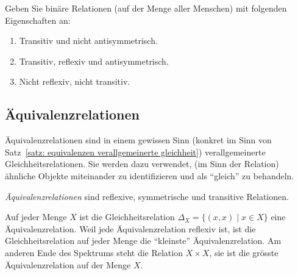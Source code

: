     \begin{ueb}
        Geben Sie binäre Relationen (auf der Menge aller Menschen) mit folgenden Eigenschaften an:
        \begin{enumerate}
            \item Transitiv und nicht antisymmetrisch.
            \item Transitiv, reflexiv und antisymmetrisch.
            \item Nicht reflexiv, nicht transitiv.
        \end{enumerate}
    \end{ueb}
    \begin{lsg}
    \end{lsg}


    \subsection*{Äquivalenzrelationen}

    Äquivalenzrelationen sind in einem gewissen Sinn (konkret im Sinn von Satz~\ref{satz: equivalenzen verallgemeinerte gleichheit}) verallgemeinerte Gleichheitsrelationen. Sie werden dazu verwendet, (im Sinn der Relation) ähnliche Objekte miteinander zu identifizieren und als ``gleich'' zu behandeln.

    \begin{df}
    \textit{Äquivalenzrelationen} sind reflexive, symmetrische und transitive Relationen.
    \end{df}

    \begin{bsp}
    Auf jeder Menge $X$ ist die Gleichheitsrelation $\Delta_X=\{(x,x)\mid x\in X \}$ eine Äquivalenzrelation. Weil jede Äquivalenzrelation reflexiv ist, ist die Gleichheitsrelation auf jeder Menge die ``kleinste'' Äquivalenzrelation. Am anderen Ende des Spektrums steht die Relation $X\times X$, sie ist die grösste Äquivalenzrelation auf der Menge $X$.
    \end{bsp}

